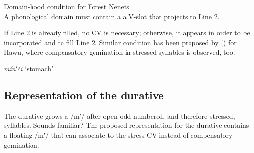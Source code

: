 \documentclass[a4paper, 12pt]{article}
\newcommand{\citeay}[2][]{
   \citeauthor{#2} (\citeyear[#1]{#2})}
\begin{document}
	\ex\label{dhcond}Domain-hood condition for Forest Nenets\\
		A phonological domain must contain a a V-slot that projects to Line 2.
	\xe
	
	If Line 2 is already filled, no CV is necessary; otherwise, it appears in order to be incorporated and to fill Line 2. Similar condition has been proposed by \citeay{ulfsbjorninn2021} for Hawu, where compensatory gemination in stressed syllables is observed, too.
	
			\ex\label{minchisch}\emph{mĭnʹči} `stomach' \\
			\xe	
			
			\subsection{Representation of the durative}
			
	The durative grows a /mʹ/ after open odd-numbered, and therefore stressed, syllables. Sounds familiar? The proposed representation for the durative contains a floating /mʹ/ that can associate to the stress CV instead of compensatory gemination.
	
\end{document}
